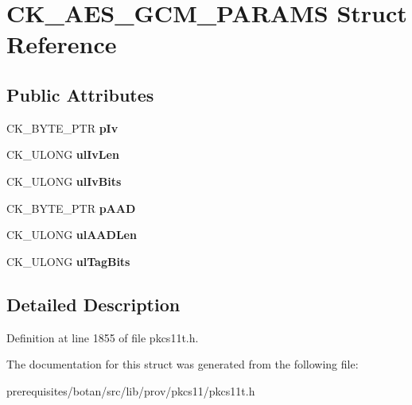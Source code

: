 \hypertarget{struct_c_k___a_e_s___g_c_m___p_a_r_a_m_s}{}\section{C\+K\+\_\+\+A\+E\+S\+\_\+\+G\+C\+M\+\_\+\+P\+A\+R\+A\+MS Struct Reference}
\label{struct_c_k___a_e_s___g_c_m___p_a_r_a_m_s}
\subsection*{Public Attributes}
\begin{DoxyCompactItemize}
\item 
\mbox{\label{struct_c_k___a_e_s___g_c_m___p_a_r_a_m_s_a04e13d2e13d24072950b952936a519a4}} 
C\+K\+\_\+\+B\+Y\+T\+E\+\_\+\+P\+TR {\bfseries p\+Iv}
\item 
\mbox{\label{struct_c_k___a_e_s___g_c_m___p_a_r_a_m_s_ab3637a7619e63914ac571b4736e020d9}} 
C\+K\+\_\+\+U\+L\+O\+NG {\bfseries ul\+Iv\+Len}
\item 
\mbox{\label{struct_c_k___a_e_s___g_c_m___p_a_r_a_m_s_a474b263799ff2d04a6f7c9da548a254d}} 
C\+K\+\_\+\+U\+L\+O\+NG {\bfseries ul\+Iv\+Bits}
\item 
\mbox{\label{struct_c_k___a_e_s___g_c_m___p_a_r_a_m_s_a55da80f688bfd7a24397fdca5196c90e}} 
C\+K\+\_\+\+B\+Y\+T\+E\+\_\+\+P\+TR {\bfseries p\+A\+AD}
\item 
\mbox{\label{struct_c_k___a_e_s___g_c_m___p_a_r_a_m_s_ad1bfc942b8f1f6ce5f1fad10fc4dba60}} 
C\+K\+\_\+\+U\+L\+O\+NG {\bfseries ul\+A\+A\+D\+Len}
\item 
\mbox{\label{struct_c_k___a_e_s___g_c_m___p_a_r_a_m_s_a878314015a72de73c76ff443e420b507}} 
C\+K\+\_\+\+U\+L\+O\+NG {\bfseries ul\+Tag\+Bits}
\end{DoxyCompactItemize}


\subsection{Detailed Description}


Definition at line 1855 of file pkcs11t.\+h.



The documentation for this struct was generated from the following file\+:\begin{DoxyCompactItemize}
\item 
prerequisites/botan/src/lib/prov/pkcs11/pkcs11t.\+h\end{DoxyCompactItemize}
